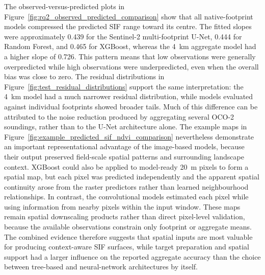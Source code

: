 The observed-versus-predicted plots in Figure~\ref{fig:rq2_observed_predicted_comparison} show that all native-footprint models compressed the predicted SIF range toward its centre. The fitted slopes were approximately 0.439 for the Sentinel-2 multi-footprint U-Net, 0.444 for Random Forest, and 0.465 for XGBoost, whereas the 4~km aggregate model had a higher slope of 0.726. This pattern means that low observations were generally overpredicted while high observations were underpredicted, even when the overall bias was close to zero. The residual distributions in Figure~\ref{fig:test_residual_distributions} support the same interpretation: the 4~km model had a much narrower residual distribution, while models evaluated against individual footprints showed broader tails. Much of this difference can be attributed to the noise reduction produced by aggregating several OCO-2 soundings, rather than to the U-Net architecture alone. The example maps in Figure~\ref{fig:example_predicted_sif_ndvi_comparison} nevertheless demonstrate an important representational advantage of the image-based models, because their output preserved field-scale spatial patterns and surrounding landscape context. XGBoost could also be applied to model-ready 20~m pixels to form a spatial map, but each pixel was predicted independently and the apparent spatial continuity arose from the raster predictors rather than learned neighbourhood relationships. In contrast, the convolutional models estimated each pixel while using information from nearby pixels within the input window. These maps remain spatial downscaling products rather than direct pixel-level validation, because the available observations constrain only footprint or aggregate means. The combined evidence therefore suggests that spatial inputs are most valuable for producing context-aware SIF surfaces, while target preparation and spatial support had a larger influence on the reported aggregate accuracy than the choice between tree-based and neural-network architectures by itself.

